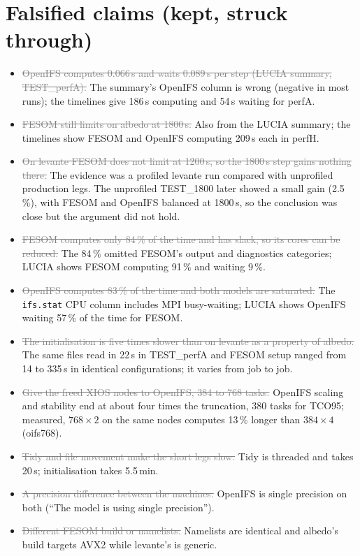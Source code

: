\documentclass[11pt,a4paper]{article}
\newcommand{\dead}[1]{\textcolor{gray}{\sout{#1}}}
\begin{document}
\section{Falsified claims (kept, struck through)}\label{sec:falsified}
\begin{itemize}
\item \dead{OpenIFS computes 0.066\,s and waits 0.089\,s per step (LUCIA summary, TEST\_perfA).} The summary's OpenIFS column is wrong (negative in most runs); the timelines give 186\,s computing and 54\,s waiting for perfA.
\item \dead{FESOM still limits on albedo at 1800\,s.} Also from the LUCIA summary; the timelines show FESOM and OpenIFS computing 209\,s each in perfH.
\item \dead{On levante FESOM does not limit at 1200\,s, so the 1800\,s step gains nothing there.} The evidence was a profiled levante run compared with unprofiled production legs. The unprofiled TEST\_1800 later showed a small gain (2.5\,\%), with FESOM and OpenIFS balanced at 1800\,s, so the conclusion was close but the argument did not hold.
\item \dead{FESOM computes only 84\,\% of the time and has slack, so its cores can be reduced.} The 84\,\% omitted FESOM's output and diagnostics categories; LUCIA shows FESOM computing 91\,\% and waiting 9\,\%.
\item \dead{OpenIFS computes 83\,\% of the time and both models are saturated.} The \texttt{ifs.stat} CPU column includes MPI busy-waiting; LUCIA shows OpenIFS waiting 57\,\% of the time for FESOM.
\item \dead{The initialisation is five times slower than on levante as a property of albedo.} The same files read in 22\,s in TEST\_perfA and FESOM setup ranged from 14 to 335\,s in identical configurations; it varies from job to job.
\item \dead{Give the freed XIOS nodes to OpenIFS, 384 to 768 tasks.} OpenIFS scaling and stability end at about four times the truncation, 380 tasks for TCO95; measured, $768\times2$ on the same nodes computes 13\,\% longer than $384\times4$ (oifs768).
\item \dead{Tidy and file movement make the short legs slow.} Tidy is threaded and takes 20\,s; initialisation takes 5.5\,min.
\item \dead{A precision difference between the machines.} OpenIFS is single precision on both (``The model is using single precision'').
\item \dead{Different FESOM build or namelists.} Namelists are identical and albedo's build targets AVX2 while levante's is generic.

\end{itemize}
\end{document}
